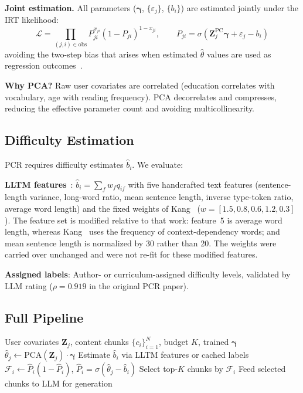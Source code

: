 \documentclass{article}
\begin{document}
\textbf{Joint estimation.} All parameters ($\boldsymbol{\gamma}$, $\{\varepsilon_j\}$, $\{b_i\}$) are estimated jointly under the IRT likelihood:
\begin{equation}
    \mathcal{L} = \prod_{(j,i) \in \mathrm{obs}} P_{ji}^{x_{ji}} (1-P_{ji})^{1-x_{ji}}, \qquad P_{ji} = \sigma\!\left(\mathbf{Z}_j^{\mathrm{PC}} \boldsymbol{\gamma} + \varepsilon_j - b_i\right)
\end{equation}
avoiding the two-step bias that arises when estimated $\hat\theta$ values are used as regression outcomes~\cite{adams1997, deboeck2004}.

\textbf{Why PCA?} Raw user covariates are correlated (education correlates with vocabulary, age with reading frequency). PCA decorrelates and compresses, reducing the effective parameter count and avoiding multicollinearity.

\subsection{Difficulty Estimation}

PCR requires difficulty estimates $\hat{b}_i$. We evaluate:

\textbf{LLTM features}~\cite{fischer1973}: $\hat{b}_i = \sum_f w_f q_{if}$ with five handcrafted text features (sentence-length variance, long-word ratio, mean sentence length, inverse type-token ratio, average word length) and the fixed weights of Kang~\cite{kang2026pcr} ($w = [1.5, 0.8, 0.6, 1.2, 0.3]$). The feature set is modified relative to that work: feature~5 is average word length, whereas Kang~\cite{kang2026pcr} uses the frequency of context-dependency words; and mean sentence length is normalized by 30 rather than 20. The weights were carried over unchanged and were not re-fit for these modified features.

\textbf{Assigned labels}: Author- or curriculum-assigned difficulty levels, validated by LLM rating ($\rho=0.919$ in the original PCR paper).

\subsection{Full Pipeline}

\begin{algorithm}[t]
\caption{PCR$^2$ Routing}
\label{alg:pcr2}
\begin{algorithmic}[1]
\REQUIRE User covariates $\mathbf{Z}_j$, content chunks $\{c_i\}_{i=1}^N$, budget $K$, trained $\boldsymbol{\gamma}$
\STATE $\hat\theta_j \leftarrow \mathrm{PCA}(\mathbf{Z}_j) \cdot \boldsymbol{\gamma}$ 
    \STATE Estimate $\hat{b}_i$ via LLTM features or cached labels
    \STATE $\mathcal{F}_i \leftarrow \hat{P}_i(1-\hat{P}_i)$, \quad $\hat{P}_i = \sigma(\hat\theta_j - \hat{b}_i)$
\ENDFOR
\STATE Select top-$K$ chunks by $\mathcal{F}_i$
\STATE Feed selected chunks to LLM for generation
\end{algorithmic}
\end{algorithm}
\end{document}
